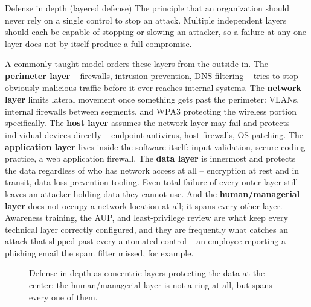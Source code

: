 \begin{definition}{Defense in depth (layered defense)}
The principle that an organization should never rely on a single control to stop an attack.
Multiple independent layers should each be capable of stopping or slowing an attacker, so a failure
at any one layer does not by itself produce a full compromise.
\end{definition}

A commonly taught model orders these layers from the outside in. The \textbf{perimeter layer} --
firewalls, intrusion prevention, DNS filtering -- tries to stop obviously malicious traffic before
it ever reaches internal systems. The \textbf{network layer} limits lateral movement once something
gets past the perimeter: VLANs, internal firewalls between segments, and WPA3 protecting the
wireless portion specifically. The \textbf{host layer} assumes the network layer may fail and
protects individual devices directly -- endpoint antivirus, host firewalls, OS patching. The
\textbf{application layer} lives inside the software itself: input validation, secure coding
practice, a web application firewall. The \textbf{data layer} is innermost and protects the data
regardless of who has network access at all -- encryption at rest and in transit, data-loss
prevention tooling. Even total failure of every outer layer still leaves an attacker holding data
they cannot use. And the \textbf{human/managerial layer} does not occupy a network location at all;
it spans every other layer. Awareness training, the AUP, and least-privilege review are what keep
every technical layer correctly configured, and they are frequently what catches an attack that
slipped past every automated control -- an employee reporting a phishing email the spam filter
missed, for example.

\begin{figure}[h]
\centering
{}
\caption{Defense in depth as concentric layers protecting the data at the center; the
human/managerial layer is not a ring at all, but spans every one of them.}
\label{fig:3.2-defense-layers}
\end{figure}

